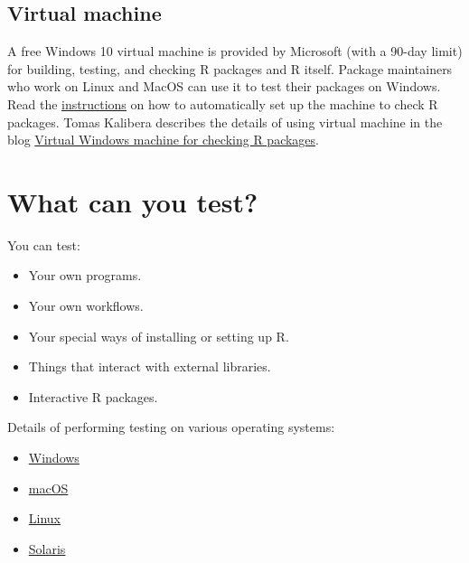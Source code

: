 \documentclass[
  letterpaper,
  DIV=11,
  numbers=noendperiod]{scrreprt}
\begin{document}
\subsection{Virtual machine}\label{VM}

A free Windows 10 virtual machine is provided by Microsoft (with a
90-day limit) for building, testing, and checking R packages and R
itself. Package maintainers who work on Linux and MacOS can use it to
test their packages on Windows. Read the
\href{https://svn.r-project.org/R-dev-web/trunk/WindowsBuilds/winutf8/ucrt3/vm.html}{instructions}
on how to automatically set up the machine to check R packages. Tomas
Kalibera describes the details of using virtual machine in the blog
\href{https://blog.r-project.org/2021/03/18/virtual-windows-machine-for-checking-r-packages/index.html}{Virtual
Windows machine for checking R packages}.

\section{What can you test?}\label{what-can-you-test}

You can test:

\begin{itemize}
\item
  Your own programs.
\item
  Your own workflows.
\item
  Your special ways of installing or setting up R.
\item
  Things that interact with external libraries.
\item
  Interactive R packages.
\end{itemize}

Details of performing testing on various operating systems:

\begin{itemize}
\item
  \href{https://blog.r-project.org/2021/04/28/r-can-use-your-help-testing-r-before-release/index.html\#on-windows}{Windows}
\item
  \href{https://blog.r-project.org/2021/04/28/r-can-use-your-help-testing-r-before-release/index.html\#on-macos}{macOS}
\item
  \href{https://blog.r-project.org/2021/04/28/r-can-use-your-help-testing-r-before-release/index.html\#on-linux}{Linux}
\item
  \href{https://blog.r-project.org/2021/04/28/r-can-use-your-help-testing-r-before-release/index.html\#on-solaris}{Solaris}
\end{itemize}
\end{document}
